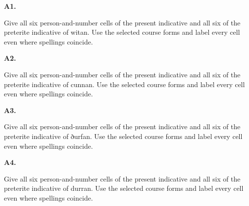 \par\begin{minipage}{\linewidth}\raggedright
\textbf{A1.}

Give all six person-and-number cells of the present indicative and all six of the preterite indicative of witan. Use the selected course forms and label every cell even where spellings coincide.

\end{minipage}\par\addvspace{4pt}

\par\begin{minipage}{\linewidth}\raggedright
\textbf{A2.}

Give all six person-and-number cells of the present indicative and all six of the preterite indicative of cunnan. Use the selected course forms and label every cell even where spellings coincide.

\end{minipage}\par\addvspace{4pt}

\par\begin{minipage}{\linewidth}\raggedright
\textbf{A3.}

Give all six person-and-number cells of the present indicative and all six of the preterite indicative of ðurfan. Use the selected course forms and label every cell even where spellings coincide.

\end{minipage}\par\addvspace{4pt}

\par\begin{minipage}{\linewidth}\raggedright
\textbf{A4.}

Give all six person-and-number cells of the present indicative and all six of the preterite indicative of durran. Use the selected course forms and label every cell even where spellings coincide.

\end{minipage}\par\addvspace{4pt}

